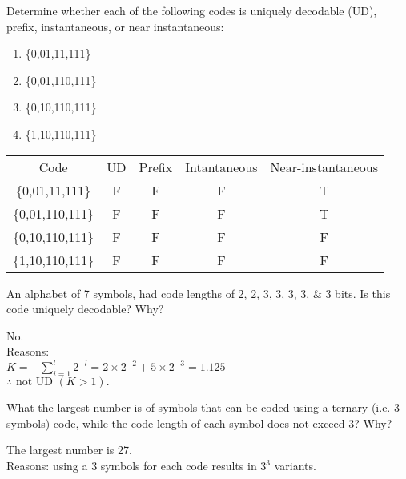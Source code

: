
\begin{question}
Determine whether each of the following codes is uniquely decodable (UD), prefix, instantaneous, or near instantaneous:
\begin{enumerate}
\item \{0,01,11,111\}
\item \{0,01,110,111\}
\item \{0,10,110,111\}
\item \{1,10,110,111\}
\end{enumerate}
\end{question}

\begin{solution}

\begin{table}[h]
\renewcommand{\arraystretch}{1.3}
\centering
\begin{tabular}{c|c|c|c|c}
\hline
 Code & UD  & Prefix  & Intantaneous & Near-instantaneous \\
\{0,01,11,111\} & F & F & F & T \\
\{0,01,110,111\} & F & F & F & T \\
\{0,10,110,111\} & F & F & F & F \\
\{1,10,110,111\} & F & F & F & F \\
\hline
\end{tabular}
\end{table}
\end{solution}

\begin{question}
An alphabet of 7 symbols, had code lengths of 2, 2, 3, 3, 3, 3, \& 3 bits. Is this code uniquely decodable? Why?
\end{question}
\begin{solution}
No. \\
Reasons: \\
$K = - \sum_{i=1}^{l} 2^{-l} = 2 \times 2^{-2} + 5 \times 2^{-3} = 1.125$ \\
$ \therefore \text{ not UD } (K>1).$ \\

\end{solution}


\begin{question}
What the largest number is of symbols that can be coded using a ternary (i.e. 3 symbols) code, while the code length of each symbol does not exceed 3? Why?
\end{question}
\begin{solution}
The largest number is 27.\\
Reasons: using a 3 symbols for each code results in $3^3$ variants. 
\end{solution}



